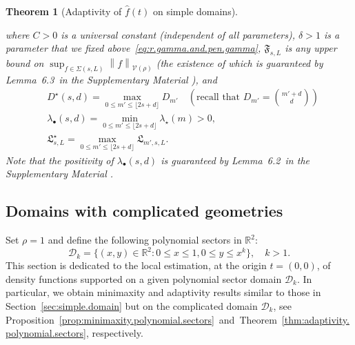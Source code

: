 \documentclass[bj,authoryear]{imsart}
\numberwithin{equation}{section}
\theoremstyle{plain}
\newtheorem{theorem}{Theorem}[section]
\theoremstyle{remark}
\newcommand{\R}{\mathbb{R}}
\newcommand{\1}{\mathds{1}}
\newcommand{\domain}{\mathcal{D}}
\newcommand{\voisin}{\mathcal{V}}
\newcommand{\finfty}{\left\|f\right\|_{\voisin(\rho)}}
\newcommand{\lemusualbehavior}{6.2~}
\newcommand{\leminftynormf}{6.3~}
\begin{document}
\begin{theorem}[Adaptivity of $\hat{f}(t)$ on simple domains]
\begin{enumerate}
\begin{equation*}
                \end{equation*}
                where $C > 0$ is a universal constant (independent of all parameters), $\delta > 1$ is a parameter that we fixed above~\eqref{eq:r.gamma.and.pen.gamma}, $\mathfrak{F}_{s,L}$ is any upper bound on $\sup_{f\in \Sigma(s,L)} \finfty$ (the existence of which is guaranteed by Lemma~\leminftynormf in the Supplementary Material \citep{BertinKlutchnikoffOuimet2024supplement}), and
                \begin{equation*}
                    \begin{aligned}
                        &D^{\star}(s,d) = \max_{0 \leq m' \leq \lfloor 2s+d \rfloor} D_{m'} \quad (\text{recall that } D_{m'} = \binom{m'+d}{d}) \\
                        &\lambda_{\bullet}(s,d) = \min_{0\leq m' \leq \lfloor 2s+d \rfloor} \lambda_{\star}(m) > 0, \\
                        &\mathfrak{L}_{s,L}^{\star} = \max_{0\leq m' \leq \lfloor 2s+d \rfloor} \mathfrak{L}_{m',s,L}.
                    \end{aligned}
                \end{equation*}
                Note that the positivity of $\lambda_{\bullet}(s,d)$ is guaranteed by Lemma~\lemusualbehavior in the Supplementary Material \citep{BertinKlutchnikoffOuimet2024supplement}.
        \end{enumerate}
    \end{theorem}

\subsection{Domains with complicated geometries}\label{sec:complicated.domain}

    Set $\rho=1$ and define the following polynomial sectors in $\R^2$:
    \begin{equation}\label{eq:domain.k}
        \domain_k = \big\{(x,y)\in \R^2 : 0\leq x \leq 1, 0\leq y \leq x^k\big\}, \quad k > 1.
    \end{equation}
    This section is dedicated to the local estimation, at the origin $t=(0,0)$, of density functions supported on a given polynomial sector domain $\domain_k$.
    In particular, we obtain minimaxity and adaptivity results similar to those in Section~\ref{sec:simple.domain} but on the complicated domain $\domain_k$, see Proposition~\ref{prop:minimaxity.polynomial.sectors}~and~Theorem~\ref{thm:adaptivity.polynomial.sectors}, respectively.
\end{document}
